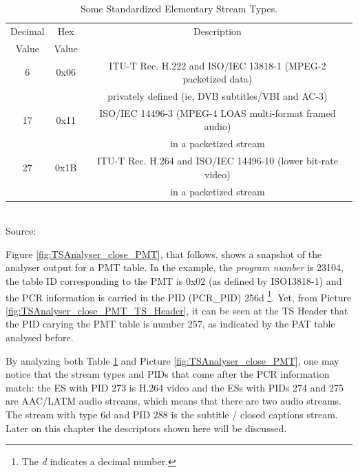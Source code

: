 \documentclass[
	12pt,				%
	openright,			%
	twoside,			%
	a4paper,			%
	brazil,
	french,				%
	english
	]{abntex2}
\begin{document}
\begin{table}[!htpd]
\caption{Some Standardized Elementary Stream Types.}
\begin{center}
\begin{tabular}{|c|c|c|}
\hline
Decimal & Hex & Description \\
Value & Value & \\
\hline
6 & 0x06 & ITU-T Rec. H.222 and ISO/IEC 13818-1 (MPEG-2 packetized data)\\
 & & privately defined (ie, DVB subtitles/VBI and AC-3)\\
 \hline
17 & 0x11 & ISO/IEC 14496-3 (MPEG-4 LOAS multi-format framed audio)\\
 & & in a packetized stream \\
 \hline
27 & 0x1B & ITU-T Rec. H.264 and ISO/IEC 14496-10 (lower bit-rate video)\\
 & & in a packetized stream \\
\hline
\end{tabular}
\label{tab_ISOESTypes}
\\Source: \cite{ISOESTypes}
\end{center}
\end{table}

Figure \ref{fig:TSAnalyser_close_PMT}, that follows, shows a snapshot of the analyser output for a PMT table. In the example, the \textit{program number} is 23104, the table ID corresponding to the PMT is 0x02 (as defined by ISO13818-1) and the PCR information is carried in the PID (PCR\_PID) 256d \footnote{The \textit{d} indicates a decimal number.}. Yet, from Picture \ref{fig:TSAnalyser_close_PMT_TS_Header}, it can be seen at the TS Header that the PID carying the PMT table is number 257, as indicated by the PAT table analysed before.

By analyzing both Table \ref{tab_ISOESTypes} and Picture \ref{fig:TSAnalyser_close_PMT}, one may notice that the stream types and PIDs that come after the PCR information match: the ES with PID 273 is H.264 video and the ESs with PIDs 274 and 275 are AAC/LATM audio streams, which means that there are two audio streams. The stream with type 6d and PID 288 is the subtitle / closed captions stream. Later on this chapter the descriptors shown here will be discussed.
\end{document}
